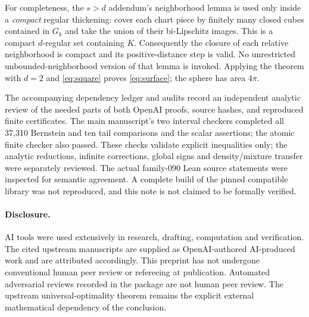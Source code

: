 \documentclass[11pt]{article}
\begin{document}
For completeness, the $s>d$ addendum's neighborhood lemma is used only
inside a \emph{compact} regular thickening: cover each chart piece by
finitely many closed cubes contained in $G_k$ and take the union of their
bi-Lipschitz images. This is a compact $d$-regular set containing $K$.
Consequently the closure of each relative neighborhood is compact and
its positive-distance step is valid. No unrestricted unbounded-neighborhood
version of that lemma is invoked. Applying the theorem with $d=2$ and
\eqref{eq:square} proves \eqref{eq:surface}; the sphere has area $4\pi$.

The accompanying dependency ledger and audits record an independent
analytic review of the needed parts of both OpenAI proofs, source hashes,
and reproduced finite certificates. The main manuscript's two interval
checkers completed all 37,310 Bernstein and ten tail comparisons and the
scalar assertions; the atomic finite checker also passed. These checks
validate explicit inequalities only; the analytic reductions, infinite
corrections, global signs and density/mixture transfer were separately
reviewed. The actual family-090 Lean source statements were inspected for
semantic agreement. A complete build of the pinned compatible library
was not reproduced, and this note is not claimed to be formally verified.

\paragraph{Disclosure.}
AI tools were used extensively in research, drafting, computation and
verification. The cited upstream manuscripts are supplied as OpenAI-authored
AI-produced work and are attributed accordingly. This preprint has not
undergone conventional human peer review or refereeing at publication.
Automated adversarial reviews recorded in the package are not human peer
review. The upstream universal-optimality theorem remains the explicit
external mathematical dependency of the conclusion.
\end{document}

